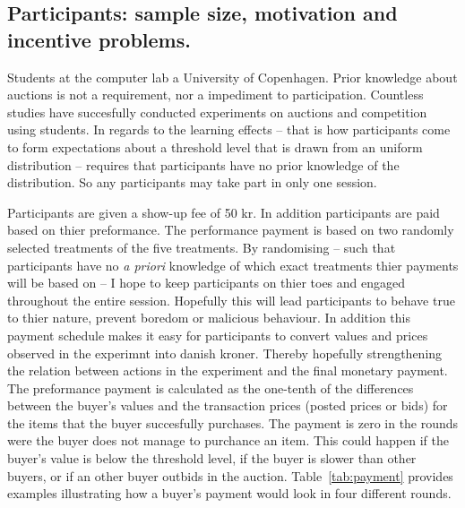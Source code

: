 \documentclass[a4paper,12pt]{article}
\begin{document}
	\subsection{Participants: sample size, motivation and incentive problems.}
	Students at the computer lab a University of Copenhagen. Prior knowledge about auctions is not a requirement, nor a impediment to participation. Countless studies have succesfully conducted experiments on auctions and competition using students. In regards to the learning effects -- that is how participants come to form expectations about a threshold level that is drawn from an uniform distribution -- requires that participants have no prior knowledge of the distribution. So any participants may take part in only one session.
	
	Participants are given a show-up fee of 50 kr. In addition participants are paid based on thier preformance. The performance payment is based on two randomly selected treatments of the five treatments. By randomising -- such that participants have no \emph{a priori} knowledge of which exact treatments thier payments will be based on -- I hope to keep participants on thier toes and engaged throughout the entire session. Hopefully this will lead participants to behave true to thier nature, prevent boredom or malicious behaviour. In addition this payment schedule makes it easy for participants to convert values and prices observed in the experimnt into danish kroner. Thereby hopefully strengthening the relation between actions in the experiment and the final monetary payment. The preformance payment is calculated as the one-tenth of the differences between the buyer's values and the transaction prices (posted prices or bids) for the items that the buyer succesfully purchases. The payment is zero in the rounds were the buyer does not manage to purchance an item. This could happen if the buyer's value is below the threshold level, if the buyer is slower than other buyers, or if an other buyer outbids in the auction. Table~\ref{tab:payment} provides examples illustrating how a buyer's payment would look in four different rounds.
	
\end{document}
